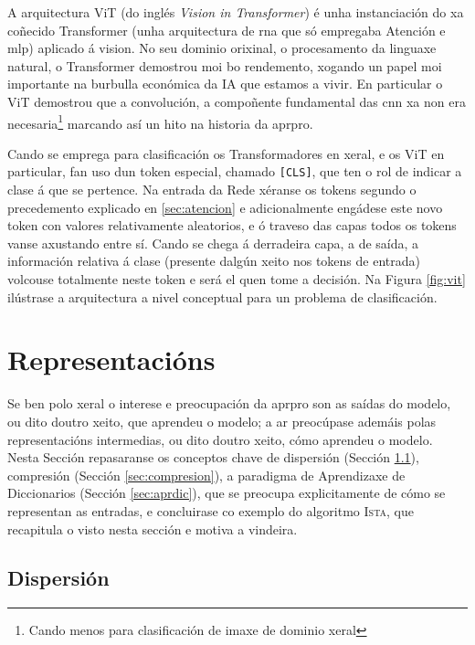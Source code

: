 A arquitectura ViT (do inglés \emph{Vision in Transformer})\cite{vit} é unha instanciación do xa coñecido Transformer \cite{aiayn} (unha arquitectura de \acrshort{rna} que só empregaba Atención e \acrshort{mlp}) aplicado á vision. No seu dominio orixinal, o procesamento da linguaxe natural, o Transformer demostrou moi bo rendemento, xogando un papel moi importante na burbulla económica da IA que estamos a vivir. En particular o ViT demostrou que a convolución, a compoñente fundamental das \acrshort{cnn} xa non era necesaria\footnote{Cando menos para clasificación de imaxe de dominio xeral\cite{vitvsresnet}} marcando así un hito na historia da \acrshort{aprpro}.

Cando se emprega para clasificación os Transformadores en xeral, e os ViT en particular, fan uso dun \gls{token} especial, chamado \texttt{[CLS]}, que ten o rol de indicar a clase á que se pertence. Na entrada da Rede xéranse os \glspl{token} segundo o precedemento explicado en \ref{sec:atencion} e adicionalmente engádese este novo \gls{token} con valores relativamente aleatorios, e ó traveso das capas todos os \glspl{token} vanse axustando entre sí. Cando se chega á derradeira capa, a de saída, a información relativa á clase (presente dalgún xeito nos \glspl{token} de entrada) volcouse totalmente neste \gls{token} e será el quen tome a decisión. Na Figura \ref{fig:vit} ilústrase a arquitectura a nivel conceptual para un problema de clasificación.



\section{Representacións}

Se ben polo xeral o interese e preocupación da \acrshort{aprpro} son as saídas do modelo, ou dito doutro xeito, que aprendeu o modelo; a \acrfull{ar} preocúpase ademáis polas representacións intermedias, ou dito doutro xeito, cómo aprendeu o modelo. Nesta Sección repasaranse os conceptos chave de dispersión (Sección \ref{sec:dispersion}), compresión (Sección \ref{sec:compresion}), a paradigma de Aprendizaxe de Diccionarios (Sección \ref{sec:aprdic}), que se preocupa explicitamente de cómo se representan as entradas, e concluirase co exemplo do algoritmo \textsc{Ista}, que recapitula o visto nesta sección e motiva a vindeira.

\subsection{Dispersión}
\label{sec:dispersion}


